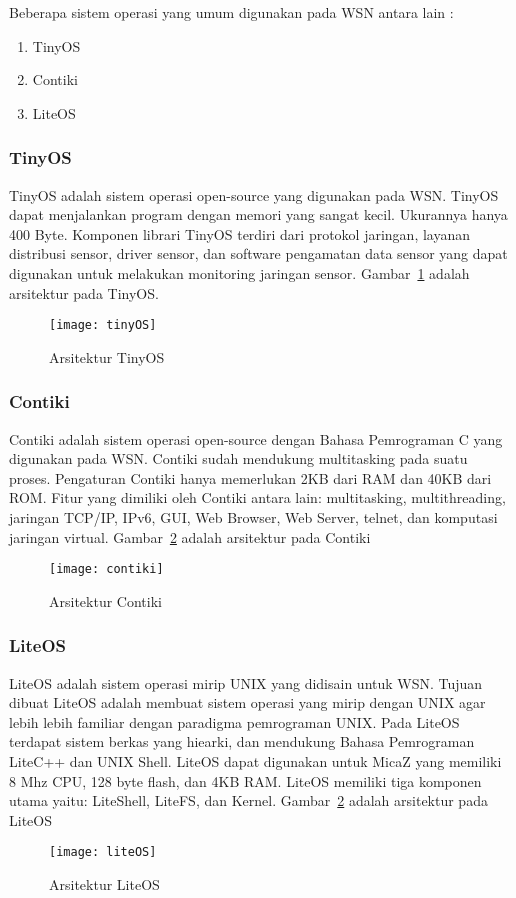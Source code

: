 Beberapa sistem operasi yang umum digunakan pada WSN antara lain :
\begin{enumerate}
	\item TinyOS
	\item Contiki
	\item LiteOS
\end{enumerate}

\subsubsection{TinyOS}
TinyOS adalah sistem operasi open-source yang digunakan pada WSN. TinyOS dapat menjalankan program dengan memori yang sangat kecil. Ukurannya hanya 400 Byte. Komponen librari TinyOS terdiri dari protokol jaringan, layanan distribusi sensor, driver sensor, dan software pengamatan data sensor yang dapat digunakan untuk melakukan monitoring jaringan sensor. Gambar~\ref{fig:tinyOS} adalah arsitektur pada TinyOS. 
\begin{figure} [H]
	\centering  
	\texttt{[image: tinyOS]}  
	\caption[Arsitektur TinyOS]{Arsitektur TinyOS} 
	\label{fig:tinyOS} 
\end{figure}

\subsubsection{Contiki}
Contiki adalah sistem operasi open-source dengan Bahasa Pemrograman C yang digunakan pada WSN. Contiki sudah mendukung multitasking pada suatu proses. Pengaturan Contiki hanya memerlukan 2KB dari RAM dan 40KB dari ROM. Fitur yang dimiliki oleh Contiki antara lain: multitasking, multithreading, jaringan TCP/IP, IPv6, GUI, Web Browser, Web Server, telnet, dan komputasi jaringan virtual. Gambar~\ref{fig:contiki} adalah arsitektur pada Contiki
\begin{figure} [H]
	\centering  
	\texttt{[image: contiki]}  
	\caption[Arsitektur Contiki]{Arsitektur Contiki} 
	\label{fig:contiki} 
\end{figure}

\subsubsection{LiteOS}
LiteOS adalah sistem operasi mirip UNIX yang didisain untuk WSN. Tujuan dibuat LiteOS adalah membuat sistem operasi yang mirip dengan UNIX agar lebih lebih familiar dengan paradigma pemrograman UNIX. Pada LiteOS terdapat sistem berkas yang hiearki, dan mendukung Bahasa Pemrograman LiteC++ dan UNIX Shell. LiteOS dapat digunakan untuk MicaZ yang memiliki 8 Mhz CPU, 128 byte flash, dan 4KB RAM. LiteOS memiliki tiga komponen utama yaitu: LiteShell, LiteFS, dan Kernel. Gambar~\ref{fig:contiki} adalah arsitektur pada LiteOS
\begin{figure} [H]
	\centering  
	\texttt{[image: liteOS]}  
	\caption[Arsitektur LiteOS]{Arsitektur LiteOS} 
	\label{fig:liteOS} 
\end{figure}

